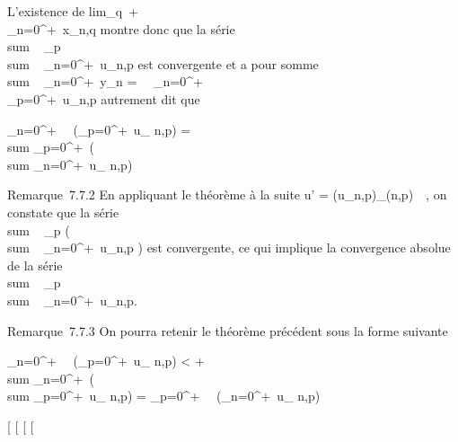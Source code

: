 \documentclass[]{article}
\begin{document}
L'existence de
lim_q\rightarrow~+\infty~~\\\sum
 _n=0^+\infty~x_n,q montre donc que la série
\\sum ~
_p \\sum ~
_n=0^+\infty~u_n,p est convergente et a pour somme
\\sum ~
_n=0^+\infty~y_n =\
\sum ~
_n=0^+\infty~\\\sum
 _p=0^+\infty~u_n,p autrement dit que

\sum _n=0^+\infty~~\left
(\sum _p=0^+\infty~u_
n,p\right ) = \\sum
_p=0^+\infty~\left (\\sum
_n=0^+\infty~u_ n,p\right )

Remarque~7.7.2 En appliquant le théorème à la suite u' =
(u_n,p)_(n,p)\in{}~\times\mathbb{N}~, on constate que
la série \\sum ~
_p\left
(\\sum ~
_n=0^+\infty~u_n,p\right
) est convergente, ce qui implique la convergence absolue de la série
\\sum ~
_p \\sum ~
_n=0^+\infty~u_n,p.

Remarque~7.7.3 On pourra retenir le théorème précédent sous la forme
suivante

\sum _n=0^+\infty~~\left
(\sum _p=0^+\infty~u_
n,p\right ) \textless{}
+\infty~\rigtharrow~\\sum
_n=0^+\infty~\left (\\sum
_p=0^+\infty~u_ n,p\right ) =
\sum _p=0^+\infty~~\left
(\sum _n=0^+\infty~u_
n,p\right )

{[}
{[}
{[}
{[}
\end{document}
